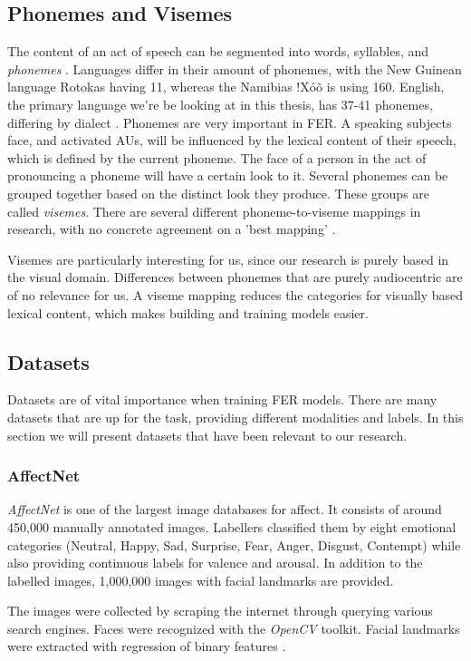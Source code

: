 \subsection{Phonemes and Visemes}
The content of an act of speech can be segmented into words, syllables, and \emph{phonemes} \cite{savin1970nonperceptual}. Languages differ in their amount of phonemes, with the New Guinean language Rotokas having 11, whereas the Namibias !Xóõ is using 160. English, the primary language we're be looking at in this thesis, has 37-41 phonemes, differing by dialect \cite{Hayes2009}. Phonemes are very important in FER. A speaking subjects face, and activated AUs, will be influenced by the lexical content of their speech, which is defined by the current phoneme. The face of a person in the act of pronouncing a phoneme will have a certain look to it. Several phonemes can be grouped together based on the distinct look they produce. These groups are called \emph{visemes}. There are several different phoneme-to-viseme mappings in research, with no concrete agreement on a 'best mapping' \cite{cappelletta2012viseme}.

Visemes are particularly interesting for us, since our research is purely based in the visual domain. Differences between phonemes that are purely audiocentric are of no relevance for us. A viseme mapping reduces the categories for visually based lexical content, which makes building and training models easier.

\subsection{Datasets}
Datasets are of vital importance when training FER models. There are many datasets that are up for the task, providing different modalities and labels. In this section we will present datasets that have been relevant to our research.

\subsubsection{AffectNet}
\emph{AffectNet} is one of the largest image databases for affect. It consists of around 450,000 manually annotated images. Labellers classified them by eight emotional categories (Neutral, Happy, Sad, Surprise, Fear, Anger, Disgust, Contempt) while also providing continuous labels for valence and arousal. In addition to the labelled images, 1,000,000 images with facial landmarks are provided.

The images were collected by scraping the internet through querying various search engines. Faces were recognized with the \emph{OpenCV} toolkit. Facial landmarks were extracted with regression of binary features \cite{ren2014face}.


